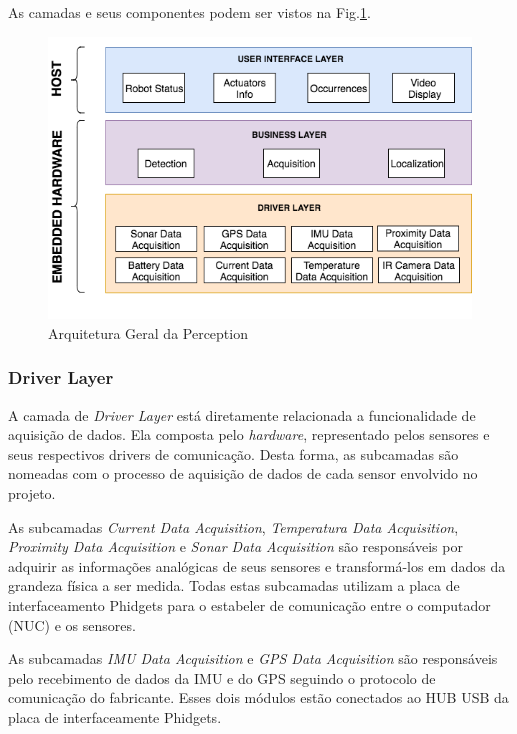 As camadas e seus componentes podem ser vistos na Fig.\ref{arqsoft}.

\begin{figure}[H]
	\centering
	\includegraphics[width=15cm]{Figures/ArquiteturadeSoftware.png}
	\caption{Arquitetura Geral da Perception}
	\label{arqsoft}
\end{figure}

\subsubsection{Driver Layer}
	
A camada de \textit{Driver Layer} está diretamente relacionada a funcionalidade de aquisição de dados. Ela composta pelo \textit{hardware}, representado pelos sensores e seus respectivos drivers de comunicação. Desta forma, as subcamadas são nomeadas com o processo de aquisição de dados de cada sensor envolvido no projeto.

As subcamadas \textit{Current Data Acquisition}, \textit{Temperatura Data Acquisition}, \textit{Proximity Data Acquisition} e \textit{Sonar Data Acquisition} são responsáveis por adquirir as informações analógicas de seus sensores e transformá-los em dados da grandeza física a ser medida. Todas estas subcamadas utilizam a placa de interfaceamento Phidgets para o estabeler de comunicação entre o computador (NUC) e os sensores.

As subcamadas \textit{IMU Data Acquisition} e \textit{GPS Data Acquisition} são responsáveis pelo recebimento de dados da IMU e do GPS seguindo o protocolo de comunicação do fabricante. Esses dois módulos estão conectados ao HUB USB da placa de interfaceamente Phidgets. 


